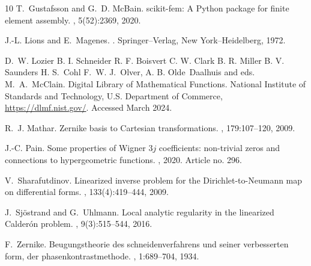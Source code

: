 \documentclass[reqno]{amsart}
\numberwithin{equation}{section}
\numberwithin{figure}{section}
\numberwithin{table}{section}
\theoremstyle{plain}
\theoremstyle{definition}
\theoremstyle{remark}
\begin{document}
\begin{thebibliography}{10}
T.~Gustafsson and G.~D. Mc{B}ain.
\newblock scikit-fem: A {P}ython package for finite element assembly.
, 5(52):2369, 2020.

J.-L. Lions and E.~Magenes.
.
\newblock Springer--Verlag, New York--Heidelberg, 1972.

D.~W. Lozier B. I. Schneider R. F. Boisvert C. W. Clark B. R. Miller B. V.
Saunders H. S.~Cohl F.~W. J.~Olver, A. B. Olde~Daalhuis and eds.
M.~A.~McClain.
 {D}igital {L}ibrary of {M}athematical {F}unctions.
\newblock National Institute of Standards and Technology, U.S. Department of
Commerce, \url{https://dlmf.nist.gov/}.
\newblock Accessed March 2024.

R.~J. Mathar.
\newblock Zernike basis to {C}artesian transformations.
, 179:107--120, 2009.

J.-C. Pain.
\newblock Some properties of {W}igner $3j$ coefficients: non-trivial zeros and
connections to hypergeometric functions.
, 2020.
\newblock Article no. 296.

V.~Sharafutdinov.
\newblock Linearized inverse problem for the {D}irichlet-to-{N}eumann map on
differential forms.
, 133(4):419--444, 2009.

J.~Sj\"{o}strand and G.~Uhlmann.
\newblock Local analytic regularity in the linearized {C}alder\'{o}n problem.
, 9(3):515--544, 2016.

F.~Zernike.
\newblock Beugungstheorie des schneidenverfahrens und seiner verbesserten form,
der phasenkontrastmethode.
, 1:689--704, 1934.
	
\end{thebibliography}
\end{document}
